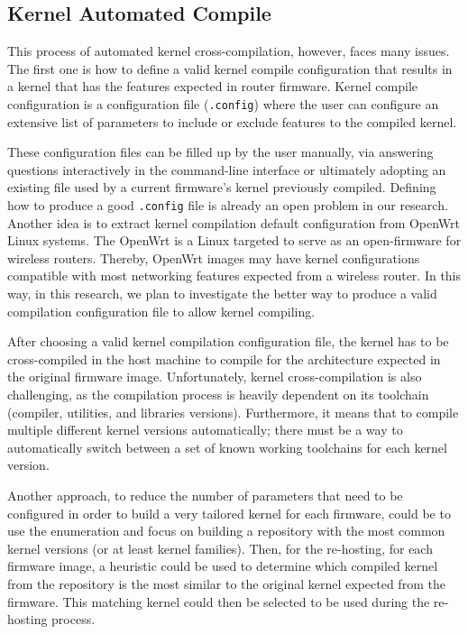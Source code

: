 \subsection{Kernel Automated Compile}

This process of automated kernel cross-compilation, however, faces many issues. The first one is how to define a valid kernel compile configuration that results in a kernel that has the features expected in router firmware. Kernel compile configuration is a configuration file ({\tt .config}) where the user can configure an extensive list of parameters to include or exclude features to the compiled kernel.

These configuration files can be filled up by the user manually, via answering questions interactively in the command-line interface or ultimately adopting an existing file used by a current firmware's kernel previously compiled. Defining how to produce a good {\tt .config} file is already an open problem in our research. Another idea is to extract kernel compilation default configuration from OpenWrt Linux systems. The OpenWrt is a Linux targeted to serve as an open-firmware for wireless routers. Thereby, OpenWrt images may have kernel configurations compatible with most networking features expected from a wireless router. In this way, in this research, we plan to investigate the better way to produce a valid compilation configuration file to allow kernel compiling.

After choosing a valid kernel compilation configuration file, the kernel has to be cross-compiled in the host machine to compile for the architecture expected in the original firmware image. Unfortunately, kernel cross-compilation is also challenging, as the compilation process is heavily dependent on its toolchain (compiler, utilities, and libraries versions). Furthermore, it means that to compile multiple different kernel versions automatically; there must be a way to automatically switch between a set of known working toolchains for each kernel version.

Another approach, to reduce the number of parameters that need to be configured in order to build a very tailored kernel for each firmware, could be to use the enumeration and focus on building a repository with the most common kernel versions (or at least kernel families). Then, for the re-hosting, for each firmware image, a heuristic could be used to determine which compiled kernel from the repository is the most similar to the original kernel expected from the firmware. This matching kernel could then be selected to be used during the re-hosting process.


